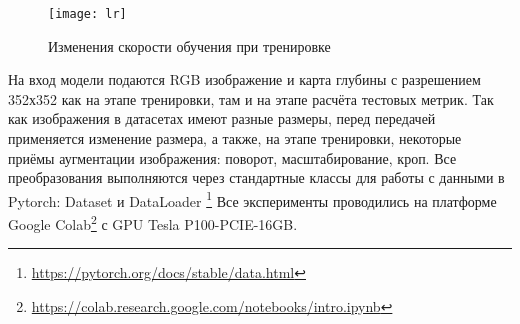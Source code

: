 \begin{figure}[h]
    \centering
    \texttt{[image: lr]}
    \caption{Изменения скорости обучения при тренировке}
    \label{fig:lr}
\end{figure}

На вход модели подаются RGB изображение и карта глубины с разрешением 352х352 как на этапе тренировки, там и на этапе расчёта тестовых метрик.
Так как изображения в датасетах имеют разные размеры, перед передачей применяется изменение размера, а также, на этапе тренировки, некоторые приёмы аугментации 
изображения: поворот, масштабирование, кроп. Все преобразования выполняются через стандартные классы для работы с данными в Pytorch: Dataset и DataLoader
\footnote{\url{https://pytorch.org/docs/stable/data.html}}
Все эксперименты проводились на платформе Google Colab\footnote{\url{https://colab.research.google.com/notebooks/intro.ipynb}}
с GPU Tesla P100-PCIE-16GB.




